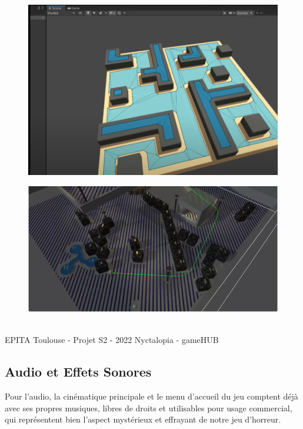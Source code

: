 \begin{figure}[H]
\centering
\begin{minipage}{.5\textwidth}
  \centering
  \includegraphics[width=.7\linewidth]{img/navmesh.PNG}
  \label{fig:navmesh}
\end{minipage}%
\begin{minipage}{.5\textwidth}
  \centering
  \includegraphics[width=.7\linewidth]{img/path.png}
  \label{fig:pathfinding}
\end{minipage}
\end{figure}

\vfill
\noindent\makebox[\linewidth]{\rule{.8\paperwidth}{.6pt}}\\[0.2cm]
EPITA Toulouse - Projet S2 - 2022 \hfill Nyctalopia - gameHUB
\noindent\makebox[\linewidth]{\rule{.8\paperwidth}{.6pt}}

\newpage

\subsection{Audio et Effets Sonores}
\setlength{\parindent}{5ex}
Pour l’audio, la cinématique principale et le menu d’accueil du jeu comptent déjà avec ses propres musiques, libres de droits et utilisables pour usage commercial, qui représentent bien l’aspect mystérieux et effrayant de notre jeu d’horreur.




